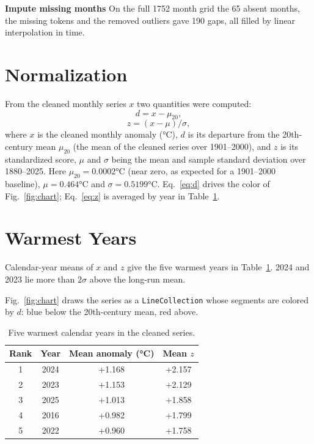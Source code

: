 \documentclass[conference]{IEEEtran}
\begin{document}
\textbf{Impute missing months}
On the full 1752 month grid the 65 absent months, the missing tokens and the removed outliers gave 190 gaps, all filled by linear interpolation in time.

\section{Normalization}
From the cleaned monthly series $x$ two quantities were computed:
\begin{equation}
d = x - \mu_{20}, \label{eq:d}
\end{equation}
\begin{equation}
z = (x - \mu)/\sigma, \label{eq:z}
\end{equation}
where $x$ is the cleaned monthly anomaly (\si{\celsius}), $d$ is its departure from the 20th-century mean $\mu_{20}$ (the mean of the cleaned series over 1901--2000), and $z$ is its standardized score, $\mu$ and $\sigma$ being the mean and sample standard deviation over 1880--2025. Here $\mu_{20}=0.0002$\si{\celsius} (near zero, as expected for a 1901--2000 baseline), $\mu=0.464$\si{\celsius} and $\sigma=0.5199$\si{\celsius}. Eq.~\eqref{eq:d} drives the color of Fig.~\ref{fig:chart}; Eq.~\eqref{eq:z} is averaged by year in Table~\ref{tab:top5}.

\section{Warmest Years}
Calendar-year means of $x$ and $z$ give the five warmest years in Table~\ref{tab:top5}. 2024 and 2023 lie more than $2\sigma$ above the long-run mean.

Fig.~\ref{fig:chart} draws the series as a \texttt{LineCollection} whose segments are colored by $d$: blue below the 20th-century mean, red above.

\begin{table}[!htbp]
\caption{Five warmest calendar years in the cleaned series.}
\label{tab:top5}
\centering
\begin{tabular}{@{}cccc@{}}
\toprule
Rank & Year & Mean anomaly (\si{\celsius}) & Mean $z$ \\
\midrule
1 & 2024 & +1.168 & +2.157 \\
2 & 2023 & +1.153 & +2.129 \\
3 & 2025 & +1.013 & +1.858 \\
4 & 2016 & +0.982 & +1.799 \\
5 & 2022 & +0.960 & +1.758 \\
\bottomrule
\end{tabular}
\end{table}
\end{document}
